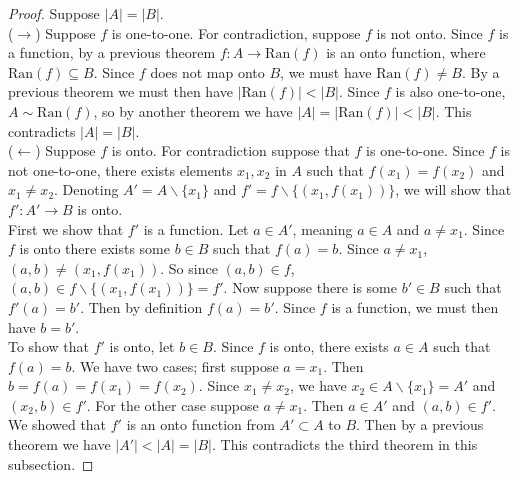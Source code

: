 \documentclass{report}
\theoremstyle{definition}
\begin{document}
\begin{proof}
Suppose $|A|=|B|$.\\
\indent($\rightarrow$) Suppose $f$ is one-to-one. For contradiction, suppose $f$ is not onto. Since $f$ is a function, by a previous
theorem $f:A\to\text{Ran}(f)$ is an onto function, where $\text{Ran}(f)\subseteq B$.
Since $f$ does not map onto $B$, we must have $\text{Ran}(f)\neq B$. By a previous theorem
we must then have $|\text{Ran}(f)|<|B|$. Since $f$ is also one-to-one, $A\sim\text{Ran}(f)$, so by
another theorem we have $|A|=|\text{Ran}(f)|<|B|$. This contradicts $|A|=|B|$.\\
\indent($\leftarrow$) Suppose $f$ is onto. For contradiction suppose that $f$ is one-to-one. Since $f$ is not one-to-one, there
exists elements $x_1,x_2$ in $A$ such that $f(x_1)=f(x_2)$ and $x_1\neq x_2$.
Denoting $A'=A\backslash\{x_1\}$ and $f'=f\backslash\{(x_1,f(x_1))\}$, we will show that $f':A'\to B$ is onto.\\
\indent First we show that $f'$ is a function. Let $a\in A'$, meaning $a\in A$ and $a\neq x_1$.
Since $f$ is onto there exists some $b\in B$ such that $f(a)=b$.
Since $a\neq x_1$, $(a,b)\neq(x_1,f(x_1))$. So since $(a,b)\in f$, $(a,b)\in f\backslash\{(x_1,f(x_1))\}=f'$.
Now suppose there is some $b'\in B$ such that $f'(a)=b'$. Then by definition $f(a)=b'$. 
Since $f$ is a function, we must then have $b=b'$.\\
\indent To show that $f'$ is onto, let $b\in B$. Since $f$ is onto, there exists $a\in A$ such that $f(a)=b$. We have two cases;
first suppose $a=x_1$. Then $b=f(a)=f(x_1)=f(x_2)$.
Since $x_1\neq x_2$, we have $x_2\in A\backslash\{x_1\}=A'$ and 
$(x_2,b)\in f'$. For the other case suppose $a\neq x_1$. Then $a\in A'$ and $(a,b)\in f'$.\\
\indent We showed that $f'$ is an onto function from $A'\subset A$ to $B$. Then by a previous theorem we have
$|A'|<|A|=|B|$. This contradicts the third theorem in this subsection. 
\end{proof}
\newpage
\end{document}
